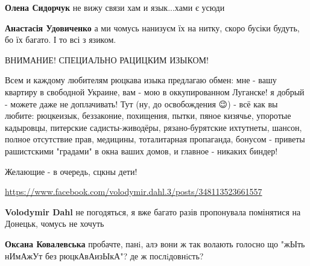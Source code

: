 \begin{itemize}
\begin{itemize}
\textbf{Олена Сидорчук} не вижу связи хам и язык...хами є усюди

 
\textbf{Анастасія Удовиченко} а ми чомусь нанизуєм їх на нитку, скоро бусіки будуть, бо їх багато. І то всі з язиком.
\end{itemize}

 

ВНИМАНИЕ! СПЕЦИАЛЬНО РАЦИЦКИМ ИЗЫКОМ!

Всем и каждому любителям рюцкава изыка предлагаю обмен: мне - вашу квартиру в
свободной Украине, вам - мою в оккупированном Луганске! я добрый - можете даже
не доплачивать! Тут (ну, до освобождения 😉) - всё как вы любите: рюцкеизык,
беззаконие, похищения, пытки, пяное кизячье, упоротые кадыровцы, питерские
садисты-живодёры, рязано-бурятские ихтутнеты, шансон, полное отсутствие прав,
медицины, тоталитарная пропаганда, бонусом - приветы рашистскими "градами" в
окна ваших домов, и главное - никаких биндер!

Желающие - в очередь, сцкны дети! 🤷

\url{https://www.facebook.com/volodymir.dahl.3/posts/348113523661557}

\begin{itemize}
 
\textbf{Volodymir Dahl} не погодяться, я вже багато разів пропонувала помінятися на Донецьк, чомусь не хочуть 🤷

 
\textbf{Оксана Ковалевська} пробачте, панi, алэ вони ж так волають голосно що "жЫть нИмАжУт без рюцкАвАизЫкА"? де ж послiдовнiсть? 🤔


\end{itemize}
\end{itemize}
